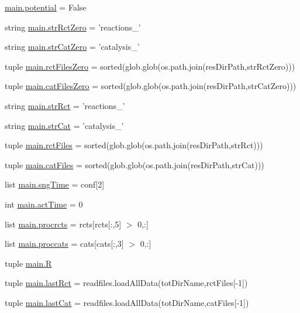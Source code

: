 \begin{DoxyCompactItemize}
\item 
\hyperlink{a00151_abe4c267a63409b1b7cd9c6aaf0779b4a}{main.\-potential} = False
\item 
string \hyperlink{a00151_adbfa32333003aa707723362b43bc11ff}{main.\-str\-Rct\-Zero} = 'reactions\-\_\-'
\item 
string \hyperlink{a00151_a6bb1e2c0e0d0a9e63313c082ee4eec76}{main.\-str\-Cat\-Zero} = 'catalysis\-\_\-'
\item 
tuple \hyperlink{a00151_aa37eddd86a00bf98dff8cc9260d6d13b}{main.\-rct\-Files\-Zero} = sorted(glob.\-glob(os.\-path.\-join(res\-Dir\-Path,str\-Rct\-Zero)))
\item 
tuple \hyperlink{a00151_a7ab6089d577bd60acf22b92e84930523}{main.\-cat\-Files\-Zero} = sorted(glob.\-glob(os.\-path.\-join(res\-Dir\-Path,str\-Cat\-Zero)))
\item 
string \hyperlink{a00151_a28a37e653a4c0984df32f8d83c3596ff}{main.\-str\-Rct} = 'reactions\-\_\-'
\item 
string \hyperlink{a00151_ab12df661b7defb4d7077777ad7d6352d}{main.\-str\-Cat} = 'catalysis\-\_\-'
\item 
tuple \hyperlink{a00151_a9016a8f5eafe76e4e8dbb1bc3ce94af5}{main.\-rct\-Files} = sorted(glob.\-glob(os.\-path.\-join(res\-Dir\-Path,str\-Rct)))
\item 
tuple \hyperlink{a00151_a189dc9cf606d870dacab059d5e7dca24}{main.\-cat\-Files} = sorted(glob.\-glob(os.\-path.\-join(res\-Dir\-Path,str\-Cat)))
\item 
list \hyperlink{a00151_ab4296f1ae2e4c4bb597ca27e84849510}{main.\-sng\-Time} = conf\mbox{[}2\mbox{]}
\item 
int \hyperlink{a00151_a9c2013c88f8354ccf6504c51843f1d5e}{main.\-act\-Time} = 0
\item 
list \hyperlink{a00151_a2120e8355b3501aed0114a74091d56c1}{main.\-procrcts} = rcts\mbox{[}rcts\mbox{[}\-:,5\mbox{]} $>$ 0,\-:\mbox{]}
\item 
list \hyperlink{a00151_a4e3c4b627d098aef6c7905cb20683e07}{main.\-proccats} = cats\mbox{[}cats\mbox{[}\-:,3\mbox{]} $>$ 0,\-:\mbox{]}
\item 
tuple \hyperlink{a00151_a8a594014e054956af345eaa5e16bea0d}{main.\-R}
\item 
tuple \hyperlink{a00151_ad9cee9fada504bb0dab86df3a416232b}{main.\-last\-Rct} = readfiles.\-load\-All\-Data(tot\-Dir\-Name,rct\-Files\mbox{[}-\/1\mbox{]})
\item 
tuple \hyperlink{a00151_a1d69cc4251d83bb227555044baf27b86}{main.\-last\-Cat} = readfiles.\-load\-All\-Data(tot\-Dir\-Name,cat\-Files\mbox{[}-\/1\mbox{]})

\end{DoxyCompactItemize}
